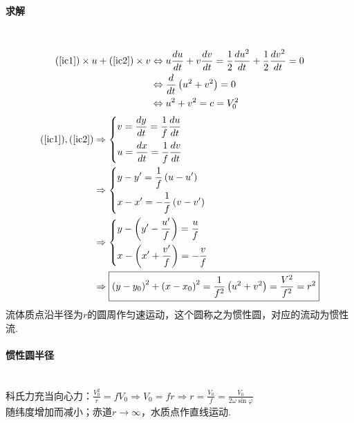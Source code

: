 \documentclass[a4paper,12pt]{article}
\begin{document}
    \paragraph{求解}~{}
    \[
        \begin{aligned}
            (\ref{ic1})\times u+(\ref{ic2})\times v&\Leftrightarrow u \frac{d u}{d t}+v \frac{d v}{d t}=\frac{1}{2} \frac{d u^{2}}{d t}+\frac{1}{2} \frac{d v^{2}}{d t}=0 \\
            &\Leftrightarrow \frac{d}{d t}\left(u^{2}+v^{2}\right)=0\\
            &\Leftrightarrow u^{2}+v^{2}=c=V_{0}^{2}
        \end{aligned}
    \]
    \[
        \begin{aligned}
            (\ref{ic1}),(\ref{ic2})
            &\Rightarrow
            \left\{\begin{aligned}&v=\frac{d y}{d t}=\frac{1}{f} \frac{d u}{d t}\\ &u=\frac{d x}{d t}=\frac{1}{f} \frac{d v}{d t}\end{aligned}\right.\\
            &\Rightarrow
            \left\{\begin{aligned}&y-y^{\prime}=\frac{1}{f}\left(u-u^{\prime}\right)\\ &x-x^{\prime}=-\frac{1}{f}\left(v-v^{\prime}\right)\end{aligned}\right.\\
            &\Rightarrow
            \left\{\begin{aligned}&y-\left(y^{\prime}-\frac{u^{\prime}}{f}\right)=\frac{u}{f}\\ &x-\left(x^{\prime}+\frac{v^{\prime}}{f}\right)=-\frac{v}{f}\end{aligned}\right.\\
            &\Rightarrow\boxed{\left(y-y_{0}\right)^{2}+\left(x-x_{0}\right)^{2}=\frac{1}{f^{2}}\left(u^{2}+v^{2}\right)=\frac{V^{2}}{f^{2}}=r^{2}}
        \end{aligned}
    \]
    流体质点沿半径为$r$的圆周作匀速运动，这个圆称之为惯性圆，对应的流动为惯性流.
    \paragraph{惯性圆半径}~{}\\
    科氏力充当向心力：$\displaystyle \frac{V_0^2}{r}=fV_0\Rightarrow V_0=fr\Rightarrow r=\frac{V_0}{f}=\frac{V_0}{2\omega \sin \varphi}$\\
    随纬度增加而减小；赤道$r\rightarrow\infty$，水质点作直线运动.
\end{document}
